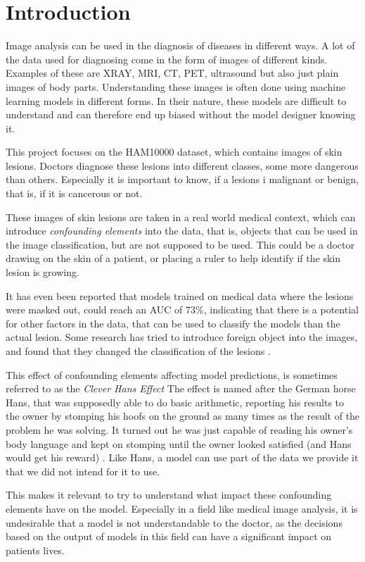 \chapter{Introduction}\label{sec:introduction}
Image analysis can be used in the diagnosis of diseases in different ways.
A lot of the data used for diagnosing come in the form of images of different kinds.
Examples of these are XRAY, MRI, CT, PET, ultrasound but also just plain images of body parts.
Understanding these images is often done using machine learning models in different forms.
In their nature, these models are difficult to understand and can therefore end up biased without
the model designer knowing it.

This project focuses on the HAM10000 dataset\cite{Tschandl_2018}, which contains images of skin lesions.
Doctors diagnose these lesions into different classes, some more dangerous than others.
Especially it is important to know,
if a lesions i malignant or benign,
that is, if it is cancerous or not.

These images of skin lesions are taken in a real world medical context,
which can introduce \textit{confounding elements} into the data,
that is, objects that can be used in the image classification,
but are not supposed to be used.
This could be a doctor drawing on the skin of a patient,
or placing a ruler to help identify if the skin lesion is growing.

It has even been reported that models trained on medical data where the lesions were masked out,
could reach an AUC of $73\%$\cite{DeConstructing_Bias_on_Skin_Lesion_Datasets_2019},
indicating that there is a potential for other factors in the data,
that can be used to classify the models than the actual lesion.
Some research has tried to introduce foreign object into the images,
and found that they changed the classification of the lesions \cite{Towards_Explainable_Classifiers_Using_the_Counterfactual_Approach_2019}.

This effect of confounding elements affecting model predictions, 
is sometimes referred to as the \textit{Clever Hans Effect}\cite{paper-using-clever-hans-phrase}
The effect is named after the German horse Hans,
that was supposedly able to do basic arithmetic,
reporting his results to the owner by stomping his hoofs on the ground as many times as the result of the problem he was solving.
It turned out he was just capable of reading his owner's body language and kept on stomping until the owner looked satisfied (and Hans would get his reward)
\cite{clever-hans-book}.
Like Hans, a model can use part of the data we provide it that we did not intend for it to use.

This makes it relevant to try to understand what impact these confounding elements have on the model.
Especially in a field like medical image analysis,
it is undesirable that a model is not understandable to the doctor,
as the decisions based on the output of models in this field can have a significant impact on patients lives.